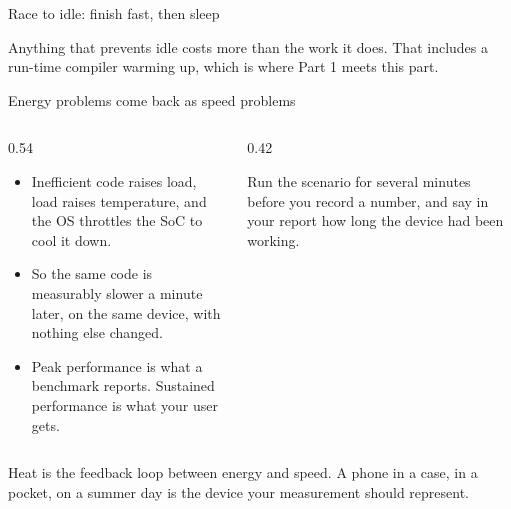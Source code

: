 \documentclass[10pt,aspectratio=169,t]{beamer}
\begin{document}
\begin{frame}[eyebrow=Energy]{Race to idle: finish fast, then sleep}
  \vskip 2mm
  \begin{grid}[3]
  \end{grid}
  \vskip 3mm
  \begin{takeaway}{Anything that prevents idle costs more than the work it does.}
    That includes a run-time compiler warming up, which is where Part 1 meets this part.
  \end{takeaway}
\end{frame}

\begin{frame}[eyebrow=Energy]{Energy problems come back as speed problems}
  \vskip 2mm
  \begin{columns}[T]
    \begin{column}{0.54\textwidth}
      \begin{itemize}
        \item Inefficient code raises load, load raises temperature, and the OS throttles the SoC to cool it down.
        \item So the same code is measurably slower a minute later, on the same device, with nothing else changed.
        \item Peak performance is what a benchmark reports. Sustained performance is what your user gets.
      \end{itemize}
    \end{column}
    \begin{column}{0.42\textwidth}
      \begin{hint}
        Run the scenario for several minutes before you record a number, and say in your report how long the device had been working.
      \end{hint}
    \end{column}
  \end{columns}
  \begin{takeaway}{Heat is the feedback loop between energy and speed.}
    A phone in a case, in a pocket, on a summer day is the device your measurement should represent.
  \end{takeaway}
\end{frame}
\end{document}
